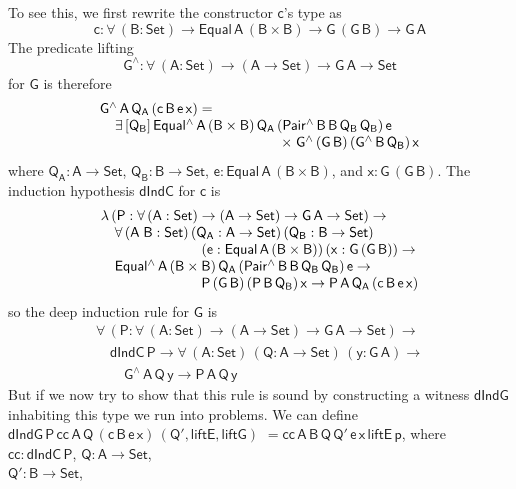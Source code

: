 \documentclass[sigplan,10pt]{acmart}
\begin{document}
To see this, we first rewrite the constructor $\mathsf{c}$'s type as
\[\mathsf{c : \forall\, (B : Set) \to Equal\,A\,(B \times B)
  \to G\,(G\,B) \to G\,A}\]
The predicate lifting
\[\mathsf{G^{\wedge} : \forall\, (A : Set) \to (A \to Set) \to G\,A \to
  Set}\] for $\mathsf{G}$ is therefore
\[\begin{array}{l}
\mathsf{G^{\wedge}\,A\,Q_A\,(c\,B\,e\,x) =}\\
\mathsf{\hspace*{0.15in}\exists\, [Q_B]\,
Equal^{\wedge}\,A\,(B \times
B)\,Q_A\,(Pair^{\wedge}\,B\,B\,Q_B\,Q_B)\,e}\\
\mathsf{\hspace*{1.8in}\times \;G^{\wedge}\,(G\,B)\,(G^{\wedge}\,B\,Q_B)\,x}
\end{array}\]
where $\mathsf{Q_A : A \to Set}$, $\mathsf{Q_B : B \to Set}$, $\mathsf{e
  : Equal\,A\,(B \times B)}$, and $\mathsf{x : G\,(G\,B)}$.
The induction hypothesis $\mathsf{dIndC}$ for $\mathsf{c}$ is
\[\begin{array}{l}
\mathsf{\lambda\, (P : \forall\, (A : Set) \to (A \to Set) \to G\,A
  \to Set)\to} \\ 
\quad\mathsf{ \forall\, (A\;B : Set)\, (Q_A : A \to Set)\, (Q_B : B
  \to Set)}\\
\hspace*{1in}\mathsf{(e : Equal\,A\,(B \times B))\, (x : G\,(G\,B))\to} \\ 
\quad\mathsf{Equal^{\wedge}\,A\,(B \times
  B)\,Q_A\,(Pair^{\wedge}\,B\,B\,Q_B\,Q_B)\,e \to}\\
\hspace*{1in}\mathsf{P\,(G\,B)\,(P\,B\,Q_B)\,x 
	\to P\,A\,Q_A\,(c\,B\, e\,x)} 
\end{array}\]
so the deep induction rule for $\mathsf{G}$ is
\[\begin{array}{l}
\mathsf{\forall\, (P : \forall\, (A : Set) \to (A \to Set) \to G\,A \to Set)
  \to}\\
\quad\mathsf{dIndC\,P \to \forall\, (A : Set)\, (Q : A \to Set)\, (y : G\,A)
  \to}\\
\quad\quad\mathsf{G^{\wedge}\,A\,Q\,y \to P\,A\,Q\,y}
\end{array}\] But if we now try to show
that this rule is sound by constructing a witness $\mathsf{dIndG}$
inhabiting this type we run into problems. We can define
$\mathsf{dIndG\,P\,cc\,A\,Q\,(c\,B\,e\,x)\,(Q', liftE, liftG)}$
$\mathsf{= cc\,A\,B\,Q\,Q'\,e\,x\,liftE\,p}$, where $\mathsf{cc :
  dIndC\,P}$, $\mathsf{Q : A \to Set}$,\\ $\mathsf{Q' : B \to Set}$,
\end{document}
